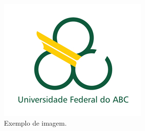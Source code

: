 \documentclass[report,14pt,openright,oneside,a4paper,brazil]{abntex2}
\begin{document}
\begin{figure}[H]
    \centering
    \includegraphics[scale=0.8]{logo.jpg}
    \caption{Exemplo de imagem.}
    \label{fig:ex}
\end{figure}
\end{document}
